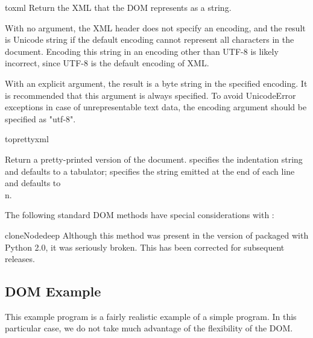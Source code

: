 \begin{methoddesc}{toxml}{}
Return the XML that the DOM represents as a string.


With no argument, the XML header does not specify an encoding, and the
result is Unicode string if the default encoding cannot represent all
characters in the document. Encoding this string in an encoding other
than UTF-8 is likely incorrect, since UTF-8 is the default encoding of
XML.

With an explicit  argument, the result is a byte string
in the specified encoding. It is recommended that this argument is
always specified. To avoid UnicodeError exceptions in case of
unrepresentable text data, the encoding argument should be specified
as "utf-8".

\end{methoddesc}

\begin{methoddesc}{toprettyxml}{}

Return a pretty-printed version of the document.  specifies
the indentation string and defaults to a tabulator;  specifies
the string emitted at the end of each line and defaults to \\n.



\end{methoddesc}

The following standard DOM methods have special considerations with
:

\begin{methoddesc}{cloneNode}{deep}
Although this method was present in the version of
 packaged with Python 2.0, it was seriously
broken.  This has been corrected for subsequent releases.
\end{methoddesc}


\subsection{DOM Example \label{dom-example}}

This example program is a fairly realistic example of a simple
program. In this particular case, we do not take much advantage
of the flexibility of the DOM.

